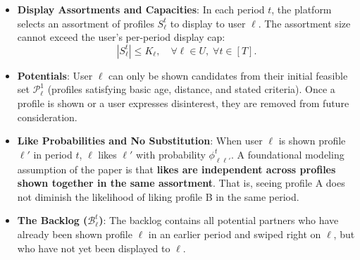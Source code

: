 \documentclass[11pt,letterpaper]{article}
\theoremstyle{definition}
\theoremstyle{plain}
\theoremstyle{remark}
\begin{document}
\begin{itemize}[leftmargin=2em]
    \item \textbf{Display Assortments and Capacities}: In each period $t$, the platform selects an assortment of profiles $S_\ell^t$ to display to user $\ell$. The assortment size cannot exceed the user's per-period display cap:
    \begin{equation}
        |S_\ell^t| \le K_\ell, \quad \forall \ell \in U, \; \forall t \in [T].
    \end{equation}
    \item \textbf{Potentials}: User $\ell$ can only be shown candidates from their initial feasible set $\mathcal{P}_\ell^1$ (profiles satisfying basic age, distance, and stated criteria). Once a profile is shown or a user expresses disinterest, they are removed from future consideration.
    \item \textbf{Like Probabilities and No Substitution}: When user $\ell$ is shown profile $\ell'$ in period $t$, $\ell$ likes $\ell'$ with probability $\phi_{\ell\ell'}^t$. A foundational modeling assumption of the paper is that \textbf{likes are independent across profiles shown together in the same assortment}. That is, seeing profile A does not diminish the likelihood of liking profile B in the same period.
    \item \textbf{The Backlog ($\mathcal{B}_\ell^t$)}: The backlog contains all potential partners who have already been shown profile $\ell$ in an earlier period and swiped right on $\ell$, but who have not yet been displayed to $\ell$.
\end{itemize}
\end{document}
